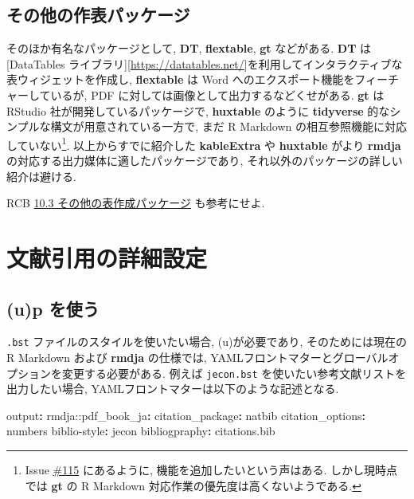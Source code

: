 \documentclass[
  xelatex,ja=standard,jafont=noto]{bxjsbook}
\newenvironment{Shaded}{\begin{snugshade}}{\end{snugshade}}
\newcommand{\AttributeTok}[1]{\textcolor[rgb]{0.77,0.63,0.00}{#1}}
\newcommand{\FunctionTok}[1]{\textcolor[rgb]{0.00,0.00,0.00}{#1}}
\newcommand{\KeywordTok}[1]{\textcolor[rgb]{0.13,0.29,0.53}{\textbf{#1}}}
\theoremstyle{definition}
\theoremstyle{definition}
\theoremstyle{definition}
\theoremstyle{definition}
\theoremstyle{remark}
\begin{document}
\hypertarget{ux305dux306eux4ed6ux306eux4f5cux8868ux30d1ux30c3ux30b1ux30fcux30b8}{%
\section{その他の作表パッケージ}\label{ux305dux306eux4ed6ux306eux4f5cux8868ux30d1ux30c3ux30b1ux30fcux30b8}}

そのほか有名なパッケージとして, \textbf{DT}, \textbf{flextable},
\textbf{gt} などがある. \textbf{DT} は{[}DataTables
ライブラリ{]}{[}\url{https://datatables.net/}{]}を利用してインタラクティブな表ウィジェットを作成し,
\textbf{flextable} は Word へのエクスポート機能をフィーチャーしているが,
PDF に対しては画像として出力するなどくせがある. \textbf{gt} は RStudio
社が開発しているパッケージで, \textbf{huxtable} のように
\textbf{tidyverse} 的なシンプルな構文が用意されている一方で, まだ R
Markdown の相互参照機能に対応していない\footnote{Issue
  \href{https://github.com/rstudio/gt/issues/115}{\#115} にあるように,
  機能を追加したいという声はある. しかし現時点では \textbf{gt} の R
  Markdown 対応作業の優先度は高くないようである.}.
以上からすでに紹介した \textbf{kableExtra} や \textbf{huxtable} がより
\textbf{rmdja} の対応する出力媒体に適したパッケージであり,
それ以外のパッケージの詳しい紹介は避ける.

RCB
\href{https://gedevan-aleksizde.github.io/rmarkdown-cookbook/table-other.html}{10.3
その他の表作成パッケージ} も参考にせよ.

\hypertarget{biblio-advaneced}{%
\chapter{文献引用の詳細設定}\label{biblio-advaneced}}

\hypertarget{ux3092ux4f7fux3046}{%
\section{\texorpdfstring{(u)p\BibTeX
を使う}{ を使う}}\label{ux3092ux4f7fux3046}}

\texttt{.bst} ファイルのスタイルを使いたい場合,
(u)\pBibTeX が必要であり, そのためには現在の R Markdown および
\textbf{rmdja} の仕様では,
YAMLフロントマターとグローバルオプションを変更する必要がある. 例えば
\texttt{jecon.bst} を使いたい参考文献リストを出力したい場合,
YAMLフロントマターは以下のような記述となる.

\begin{Shaded}
\begin{Highlighting}[]
\FunctionTok{output}\KeywordTok{:}
\AttributeTok{  rmdja:}\FunctionTok{:pdf\_book\_ja}\KeywordTok{:}
\AttributeTok{    }\FunctionTok{citation\_package}\KeywordTok{:}\AttributeTok{ natbib}
\AttributeTok{    }\FunctionTok{citation\_options}\KeywordTok{:}\AttributeTok{ numbers}
\FunctionTok{biblio{-}style}\KeywordTok{:}\AttributeTok{ jecon}
\FunctionTok{bibliogpraphy}\KeywordTok{:}\AttributeTok{ citations.bib}
\end{Highlighting}
\end{Shaded}
\end{document}
